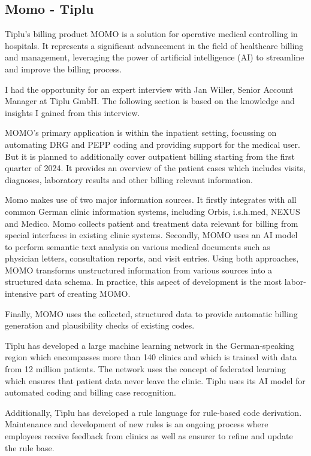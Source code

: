 \subsection{Momo - Tiplu}

Tiplu's billing product MOMO is a solution for operative medical controlling in hospitals.
It represents a significant advancement in the field of healthcare billing and management,
leveraging the power of artificial intelligence (AI) to streamline and improve the billing process.

I had the opportunity for an expert interview with Jan Willer, Senior Account Manager at Tiplu GmbH.
The following section is based on the knowledge and insights I gained from this interview.

MOMO's primary application is within the inpatient setting, focussing on automating DRG and PEPP coding and providing support for the medical user.
But it is planned to additionally cover outpatient billing starting from the first quarter of 2024.
It provides an overview of the patient cases which includes visits, diagnoses, laboratory results and other billing relevant information.

Momo makes use of two major information sources.
It firstly integrates with all common German clinic information systems, including Orbis, i.s.h.med, NEXUS and Medico.
Momo collects patient and treatment data relevant for billing from special interfaces in existing clinic systems.
Secondly, MOMO uses an AI model to perform semantic text analysis on various medical documents such as physician letters, consultation reports, and visit entries.
Using both approaches, MOMO transforms unstructured information from various sources into a structured data schema.
In practice, this aspect of development is the most labor-intensive part of creating MOMO.

Finally, MOMO uses the collected, structured data to provide automatic billing generation and plausibility checks of existing codes.

Tiplu has developed a large machine learning network in the German-speaking region which encompasses more than 140 clinics and which is trained with data from 12 million patients.
The network uses the concept of federated learning which ensures that patient data never leave the clinic.
Tiplu uses its AI model for automated coding and billing case recognition.

Additionally, Tiplu has developed a rule language for rule-based code derivation.
Maintenance and development of new rules is an ongoing process where employees receive feedback from clinics as well as ensurer to refine and update the rule base.

